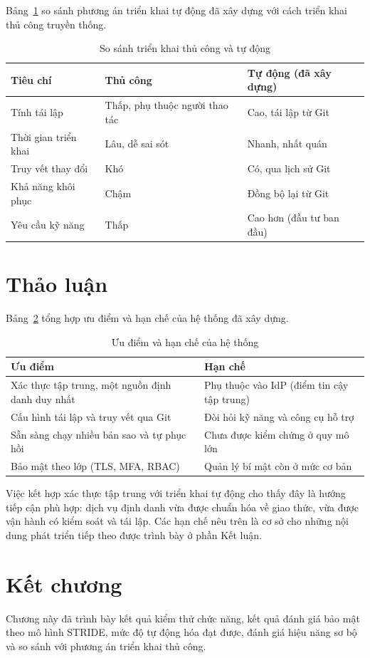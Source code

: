 Bảng~\ref{tab:ss-trienkhai} so sánh phương án triển khai tự động đã xây dựng
với cách triển khai thủ công truyền thống.

\begin{table}[htbp]
\centering
\caption{So sánh triển khai thủ công và tự động}
\label{tab:ss-trienkhai}
\small
\begin{tabular}{p{4.2cm} p{4.6cm} p{4.6cm}}
\toprule
\textbf{Tiêu chí} & \textbf{Thủ công} & \textbf{Tự động (đã xây dựng)}\\
\midrule
Tính tái lập & Thấp, phụ thuộc người thao tác & Cao, tái lập từ Git\\
Thời gian triển khai & Lâu, dễ sai sót & Nhanh, nhất quán\\
Truy vết thay đổi & Khó & Có, qua lịch sử Git\\
Khả năng khôi phục & Chậm & Đồng bộ lại từ Git\\
Yêu cầu kỹ năng & Thấp & Cao hơn (đầu tư ban đầu)\\
\bottomrule
\end{tabular}
\end{table}

\section{Thảo luận}
\label{sec:thaoluan}

Bảng~\ref{tab:uunhuoc} tổng hợp ưu điểm và hạn chế của hệ thống đã xây dựng.

\begin{table}[htbp]
\centering
\caption{Ưu điểm và hạn chế của hệ thống}
\label{tab:uunhuoc}
\small
\begin{tabular}{p{6.2cm} p{6.6cm}}
\toprule
\textbf{Ưu điểm} & \textbf{Hạn chế}\\
\midrule
Xác thực tập trung, một nguồn định danh duy nhất & Phụ thuộc vào IdP (điểm tin cậy tập trung)\\
Cấu hình tái lập và truy vết qua Git & Đòi hỏi kỹ năng và công cụ hỗ trợ\\
Sẵn sàng chạy nhiều bản sao và tự phục hồi & Chưa được kiểm chứng ở quy mô lớn\\
Bảo mật theo lớp (TLS, MFA, RBAC) & Quản lý bí mật còn ở mức cơ bản\\
\bottomrule
\end{tabular}
\end{table}

Việc kết hợp xác thực tập trung với triển khai tự động cho thấy đây là hướng
tiếp cận phù hợp: dịch vụ định danh vừa được chuẩn hóa về giao thức, vừa được
vận hành có kiểm soát và tái lập. Các hạn chế nêu trên là cơ sở cho những nội
dung phát triển tiếp theo được trình bày ở phần Kết luận.

\section{Kết chương}

Chương này đã trình bày kết quả kiểm thử chức năng, kết quả đánh giá bảo mật
theo mô hình STRIDE, mức độ tự động hóa đạt được, đánh giá hiệu năng sơ bộ và so
sánh với phương án triển khai thủ công.
